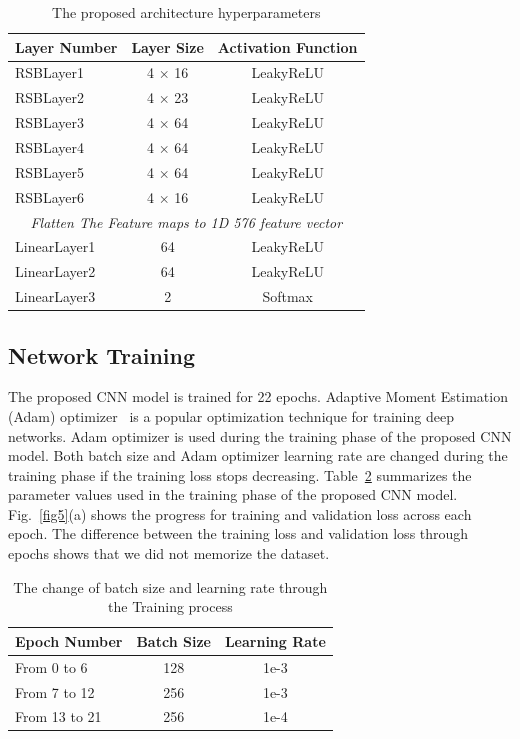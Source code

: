 \begin{table}[htbp]
\caption{The proposed architecture hyperparameters}
\begin{center}

\begin{tabular}{|l|c|c|}
\hline
\textbf{Layer Number} & \textbf{Layer Size} & \textbf{Activation Function} \\
\hline
\hline
RSBLayer1 & 4 $\times$ 16 & LeakyReLU\\
\hline
RSBLayer2 & 4 $\times$ 23 & LeakyReLU\\
\hline
RSBLayer3 & 4 $\times$ 64 & LeakyReLU\\
\hline
RSBLayer4 & 4 $\times$ 64 & LeakyReLU\\
\hline
RSBLayer5 & 4 $\times$ 64 & LeakyReLU\\
\hline
RSBLayer6 & 4 $\times$ 16 & LeakyReLU\\
\hline
\multicolumn{3}{|c|}{\textit{Flatten The Feature maps to 1D 576 feature  vector}}\\
\cline{1-3}
LinearLayer1 & 64 & LeakyReLU\\
\hline
LinearLayer2 & 64 & LeakyReLU\\
\hline
LinearLayer3 & 2 & Softmax\\
\hline
\end{tabular}
\label{lyrSpec}
\end{center}
\end{table}

\subsection{Network Training}
The proposed CNN model is trained for 22 epochs. Adaptive Moment Estimation (Adam) optimizer~\cite{kingma2014adam} is a popular optimization technique for training deep networks. Adam optimizer is used during the training phase of the proposed CNN model. Both batch size and Adam optimizer learning rate are changed during the training phase if the training loss stops decreasing. Table~\ref{tabTrparam} summarizes the parameter values used in the training phase of the proposed CNN model. Fig.~\ref{fig5}(a) shows the progress for training and validation loss across each epoch. The difference between the training loss and validation loss through epochs shows that we did not memorize the dataset.
\begin{table}[htbp]
\caption{The change of batch size and learning rate through the Training process}
\begin{center}

\begin{tabular}{|l|c|c|}
\hline
\textbf{Epoch Number} & \textbf{Batch Size} & \textbf{Learning Rate} \\
\hline
\hline
From 0 to 6 & 128 & 1e-3\\
\hline
From 7 to 12 & 256 & 1e-3\\
\hline
From 13 to 21 & 256 & 1e-4\\
\hline
 
\end{tabular}
\label{tabTrparam}
\end{center}
\end{table}



